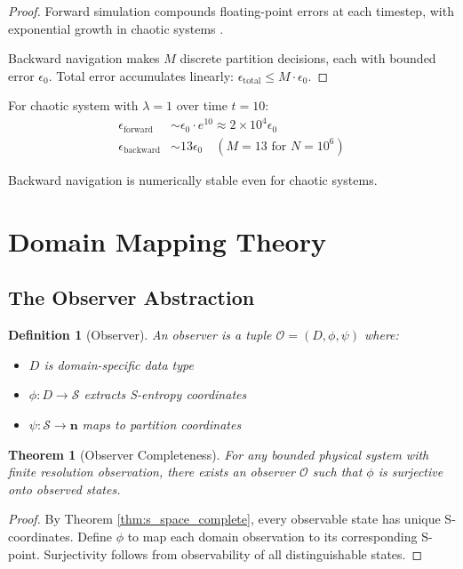 \documentclass[twocolumn,10pt]{article}
\newtheorem{theorem}{Theorem}
\newtheorem{definition}{Definition}
\begin{document}
\begin{proof}
Forward simulation compounds floating-point errors at each timestep, with exponential growth in chaotic systems \cite{Tao2021}.

Backward navigation makes $M$ discrete partition decisions, each with bounded error $\epsilon_0$. Total error accumulates linearly: $\epsilon_{\text{total}} \leq M \cdot \epsilon_0$.
\end{proof}

For chaotic system with $\lambda = 1$ over time $t = 10$:
\begin{align}
\epsilon_{\text{forward}} &\sim \epsilon_0 \cdot e^{10} \approx 2 \times 10^4 \epsilon_0 \\
\epsilon_{\text{backward}} &\sim 13 \epsilon_0 \quad (M = 13 \text{ for } N = 10^6)
\end{align}

Backward navigation is numerically stable even for chaotic systems.

\section{Domain Mapping Theory}

\subsection{The Observer Abstraction}

\begin{definition}[Observer]
An observer is a tuple $\mathcal{O} = (D, \phi, \psi)$ where:
\begin{itemize}
\item $D$ is domain-specific data type
\item $\phi: D \to \mathcal{S}$ extracts S-entropy coordinates
\item $\psi: \mathcal{S} \to \mathbf{n}$ maps to partition coordinates
\end{itemize}
\end{definition}

\begin{theorem}[Observer Completeness]
For any bounded physical system with finite resolution observation, there exists an observer $\mathcal{O}$ such that $\phi$ is surjective onto observed states.
\end{theorem}

\begin{proof}
By Theorem \ref{thm:s_space_complete}, every observable state has unique S-coordinates. Define $\phi$ to map each domain observation to its corresponding S-point. Surjectivity follows from observability of all distinguishable states.
\end{proof}
\end{document}
